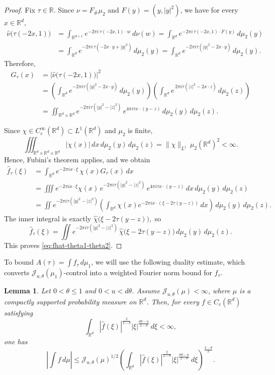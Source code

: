\documentclass[11pt]{amsart}
\numberwithin{equation}{section}
\renewcommand{\le}{\leqslant}
\newcommand{\J}{\mathcal{J}}
\newtheorem{lemma}[theorem]{Lemma}
\theoremstyle{plain}
\theoremstyle{remark}
\newcommand{\Rd}{\mathbb{R}^d}
\begin{document}
    \begin{proof}
Fix \(\tau\in\mathbb R\). Since \(\nu=F_{\#}\mu_2\) and \(F(y)=(y,|y|^2)\), we have for every
\(x\in\mathbb R^d\),
\begin{align*}
\widehat\nu\bigl(\tau(-2x,1)\bigr)
&=
\int_{\mathbb R^{d+1}} e^{-2\pi i\, \tau(-2x,1)\cdot w}\,d\nu(w)=
\int_{\mathbb R^d} e^{-2\pi i\, \tau(-2x,1)\cdot F(y)}\,d\mu_2(y) \\
&=
\int_{\mathbb R^d} e^{-2\pi i\, \tau(-2x\cdot y+|y|^2)}\,d\mu_2(y)=
\int_{\mathbb R^d} e^{-2\pi i\tau(|y|^2-2x\cdot y)}\,d\mu_2(y).
\end{align*}
Therefore,
\begin{align*}
G_\tau(x)
&=
\left|\widehat\nu\bigl(\tau(-2x,1)\bigr)\right|^2 \\
&=
\left(\int_{\mathbb R^d} e^{-2\pi i\tau(|y|^2-2x\cdot y)}\,d\mu_2(y)\right)
\left(\int_{\mathbb R^d} e^{\,2\pi i\tau(|z|^2-2x\cdot z)}\,d\mu_2(z)\right) \\
&=
\iint_{\mathbb R^d\times\mathbb R^d}
e^{-2\pi i\tau(|y|^2-|z|^2)}\,e^{4\pi i\tau x\cdot (y-z)}
\,d\mu_2(y)\,d\mu_2(z).
\end{align*}

Since \(\chi\in C_c^\infty(\mathbb R^d)\subset L^1(\mathbb R^d)\) and \(\mu_2\) is finite,
\[
\iiint_{\mathbb R^d\times\mathbb R^d\times\mathbb R^d}
|\chi(x)|\,dx\,d\mu_2(y)\,d\mu_2(z)
=
\|\chi\|_{L^1}\,\mu_2(\mathbb R^d)^2<\infty.
\]
Hence, Fubini's theorem applies, and we obtain
\begin{align*}
\widehat f_\tau(\xi)
&=
\int_{\mathbb R^d} e^{-2\pi i x\cdot \xi}\,\chi(x)G_\tau(x)\,dx \\
&=
\iiint
e^{-2\pi i x\cdot \xi}\chi(x)\,
e^{-2\pi i\tau(|y|^2-|z|^2)}\,e^{4\pi i\tau x\cdot (y-z)}
\,dx\,d\mu_2(y)\,d\mu_2(z) \\
&=
\iint
e^{-2\pi i\tau(|y|^2-|z|^2)}
\left(
\int_{\mathbb R^d}
\chi(x)e^{-2\pi i x\cdot(\xi-2\tau(y-z))}\,dx
\right)
\,d\mu_2(y)\,d\mu_2(z).
\end{align*}
The inner integral is exactly
$
\widehat\chi\bigl(\xi-2\tau(y-z)\bigr),
$
so
\[
\widehat f_{\tau}(\xi)
=
\iint e^{-2\pi i\tau(|y|^2-|z|^2)}\,\widehat\chi\bigl(\xi-2\tau(y-z)\bigr)
\,d\mu_2(y)\,d\mu_2(z).
\]
This proves \eqref{eq:fhat-theta1-theta2}.
\end{proof}
To bound \(A(\tau)=\int f_\tau\,d\mu_1\), we will use the following duality estimate, which converts \(\J_{u,\theta}(\mu_1)\)-control into a weighted Fourier norm bound for \(f_\tau\).
\begin{lemma}\label{lem:duality-general}
Let $0<\theta\le 1$ and $0<u<d\theta$. Assume $\J_{u,\theta}(\mu)<\infty$, where
$\mu$ is a compactly supported probability measure on $\Rd$. Then, for every $f\in C_c(\Rd)$ satisfying
\[
\int_{\Rd}|\widehat f(\xi)|^{\frac{2}{2-\theta}}|\xi|^{\frac{\theta d-u}{2-\theta}}\,d\xi<\infty,
\]
one has
\begin{equation}\label{eq:duality-general}
\left|\int f\,d\mu\right|
\le
\J_{u,\theta}(\mu)^{1/2}
\left(\int_{\Rd}|\widehat f(\xi)|^{\frac{2}{2-\theta}}|\xi|^{\frac{\theta d-u}{2-\theta}}\,d\xi\right)^{\frac{2-\theta}{2}}.
\end{equation}
\end{lemma}
\end{document}
